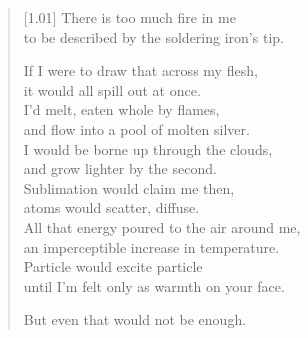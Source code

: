 \begin{verse}[1.01\textwidth]
  There is too much fire in me \\
  to be described by the soldering iron's tip.

  If I were to draw that across my flesh,\\
  \vin it would all spill out at once.\\
  I'd melt, eaten whole by flames,\\
  \vin and flow into a pool of molten silver.\\
  I would be borne up through the clouds,\\
  \vin and grow lighter by the second.\\
  Sublimation would claim me then,\\
  \vin atoms would scatter, diffuse.\\
  All that energy poured to the air around me,\\
  \vin an imperceptible increase in temperature.\\
  Particle would excite particle\\
  \vin until I'm felt only as warmth on your face.

  But even that would not be enough.
\end{verse}
